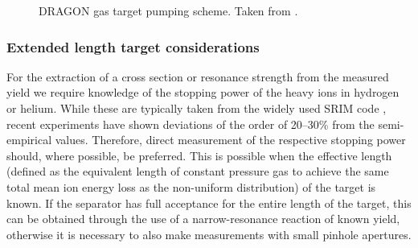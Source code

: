 \begin{figure}
\caption{DRAGON gas target pumping scheme. Taken from \cite{hutc03b}.}
\label{fig:dragon_pumping}
\end{figure}

\subsubsection{Extended length target considerations}
For the extraction of a cross section or resonance strength from the measured yield we require knowledge of the stopping power of the heavy ions in hydrogen or helium. While these are typically taken from the widely used SRIM code \cite{zieg}, recent experiments \cite{grei04} have shown deviations of the order of 20--30\% from the semi-empirical values. Therefore, direct measurement of the respective stopping power should, where possible, be preferred. This is possible when the effective length (defined as the equivalent length of constant pressure gas to achieve the same total mean ion energy loss as the non-uniform distribution) of the target is known. If the separator has full acceptance for the entire length of the target, this can be obtained through the use of a narrow-resonance reaction of known yield, otherwise it is necessary to also make measurements with small pinhole apertures. 

